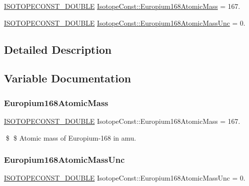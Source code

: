 \begin{DoxyCompactItemize}
\item 
\mbox{\hyperlink{group___isotope_const-_macros_ga8f45a7272ce02c0b4c65c44636ed719a}{I\+S\+O\+T\+O\+P\+E\+C\+O\+N\+S\+T\+\_\+\+D\+O\+U\+B\+LE}} \mbox{\hyperlink{group___isotope_const-_europium-_eu168_gaa756c075ff1fa8a3baec748413be6a65}{Isotope\+Const\+::\+Europium168\+Atomic\+Mass}} = 167.
\item 
\mbox{\hyperlink{group___isotope_const-_macros_ga8f45a7272ce02c0b4c65c44636ed719a}{I\+S\+O\+T\+O\+P\+E\+C\+O\+N\+S\+T\+\_\+\+D\+O\+U\+B\+LE}} \mbox{\hyperlink{group___isotope_const-_europium-_eu168_gab0d6489b3d30c0a064676366e66fcb77}{Isotope\+Const\+::\+Europium168\+Atomic\+Mass\+Unc}} = 0.
\end{DoxyCompactItemize}


\subsection{Detailed Description}


\subsection{Variable Documentation}
\mbox{\label{group___isotope_const-_europium-_eu168_gaa756c075ff1fa8a3baec748413be6a65}} 
\subsubsection{\texorpdfstring{Europium168\+Atomic\+Mass}{Europium168AtomicMass}}
{\footnotesize\ttfamily \mbox{\hyperlink{group___isotope_const-_macros_ga8f45a7272ce02c0b4c65c44636ed719a}{I\+S\+O\+T\+O\+P\+E\+C\+O\+N\+S\+T\+\_\+\+D\+O\+U\+B\+LE}} Isotope\+Const\+::\+Europium168\+Atomic\+Mass = 167.}

\$ \$ Atomic mass of Europium-\/168 in amu. \mbox{\label{group___isotope_const-_europium-_eu168_gab0d6489b3d30c0a064676366e66fcb77}} 
\subsubsection{\texorpdfstring{Europium168\+Atomic\+Mass\+Unc}{Europium168AtomicMassUnc}}
{\footnotesize\ttfamily \mbox{\hyperlink{group___isotope_const-_macros_ga8f45a7272ce02c0b4c65c44636ed719a}{I\+S\+O\+T\+O\+P\+E\+C\+O\+N\+S\+T\+\_\+\+D\+O\+U\+B\+LE}} Isotope\+Const\+::\+Europium168\+Atomic\+Mass\+Unc = 0.}

